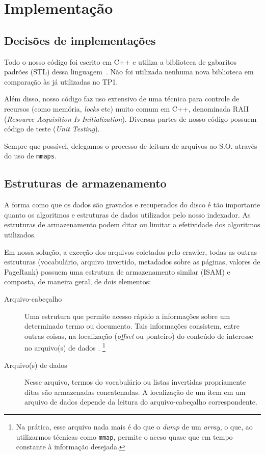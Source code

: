 \documentclass[10pt,twocolumn]{article}
\begin{document}

\section{Implementação}\label{sec:implementation}

\subsection{Decisões de implementações}

Todo o nosso código foi escrito em C++
e utiliza a biblioteca de gabaritos padrões (STL) dessa
linguagem~\cite{stroustrup97}.
Não foi utilizada nenhuma nova biblioteca em comparação às já utilizadas
no TP1.

Além disso, nosso código faz uso extensivo de uma técnica para controle
de recursos (como memória, \emph{locks} etc)  muito comum em C++,
denominada RAII (\emph{Resource Acquisition Is Initialization}).
Diversas partes de nosso código possuem código de teste (\emph{Unit
Testing}).

Sempre que possível, delegamos o processo de leitura de
arquivos ao S.O. através do uso de \texttt{mmaps}.

\subsection{Estruturas de armazenamento}\label{sec:storage}

A forma como que os dados são gravados e recuperados do disco é
tão importante quanto os algoritmos e estruturas de dados utilizados
pelo nosso indexador. As estruturas de armazenamento podem ditar ou
limitar a efetividade dos algoritmos utilizados.

Em nossa solução, a exceção dos arquivos coletados pelo crawler, todas
as outras estruturas (vocabulário, arquivo invertido, metadados sobre as
páginas, valores de PageRank) possuem uma estrutura
de armazenamento similar (ISAM) e composta, de maneira geral, de dois
elementos:
\begin{description}

\item[Arquivo-cabeçalho] Uma estrutura que permite acesso rápido a
informações sobre um determinado termo ou documento.  Tais informações
consistem, entre outras coisas, na localização (\emph{offset} ou
ponteiro) do conteúdo de interesse no arquivo(s) de dados . \footnote{
Na prática, esse arquivo nada mais é do que o \emph{dump} de um
\emph{array}, o que, ao utilizarmos técnicas como \texttt{mmap}, permite
o aceso quase que em tempo constante à informação desejada.}

\item[Arquivo(s) de dados] Nesse arquivo, termos do vocabulário ou listas
invertidas propriamente ditas são armazenadas concatenadas. A
localização de um item em um arquivo de dados depende da leitura do
arquivo-cabeçalho correspondente.
\end{description}
\end{document}
